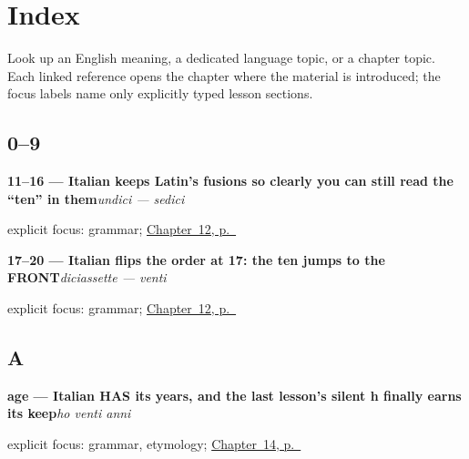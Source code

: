 
\chapter*{Index}

Look up an English meaning, a dedicated language topic, or a chapter topic. Each linked reference opens the chapter where the material is introduced; the focus labels name only explicitly typed lesson sections.

\section*{0--9}

\noindent\begin{minipage}[t]{\linewidth}
\raggedright
\textbf{11–16 — Italian keeps Latin's fusions so clearly you can still read the \textquotedblleft{}ten\textquotedblright{} in them}\enspace\emph{undici — sedici}\par
\footnotesize explicit focus: grammar; \hyperref[ch:it-numbers-eleven-to-twenty]{Chapter~12, p.~\pageref*{ch:it-numbers-eleven-to-twenty}}
\end{minipage}\par\smallskip

\noindent\begin{minipage}[t]{\linewidth}
\raggedright
\textbf{17–20 — Italian flips the order at 17: the ten jumps to the FRONT}\enspace\emph{diciassette — venti}\par
\footnotesize explicit focus: grammar; \hyperref[ch:it-numbers-eleven-to-twenty]{Chapter~12, p.~\pageref*{ch:it-numbers-eleven-to-twenty}}
\end{minipage}\par\smallskip

\section*{A}

\noindent\begin{minipage}[t]{\linewidth}
\raggedright
\textbf{age — Italian HAS its years, and the last lesson's silent h finally earns its keep}\enspace\emph{ho venti anni}\par
\footnotesize explicit focus: grammar, etymology; \hyperref[ch:it-having-and-age]{Chapter~14, p.~\pageref*{ch:it-having-and-age}}
\end{minipage}\par\smallskip

